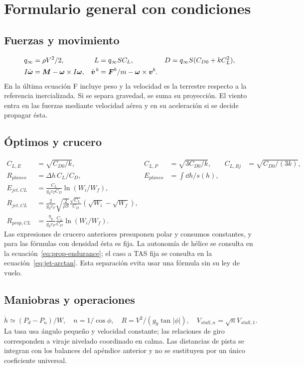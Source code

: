 \chapter{Formulario general con condiciones}
\section{Fuerzas y movimiento}
\begin{align}
q_\infty&=\rho V^2/2,&L&=q_\infty SC_L,&D&=q_\infty S(C_{D0}+kC_L^2),\\
I\dot{\boldsymbol{\omega}}&=\boldsymbol{M}-\boldsymbol{\omega}\times I\boldsymbol{\omega},&
\dot{\boldsymbol{v}}^{\,b}&=\boldsymbol{F}^b/m-\boldsymbol{\omega}\times\boldsymbol{v}^b.
\end{align}
En la última ecuación F incluye peso y la velocidad es la terrestre respecto a la referencia inercializada. Si se separa gravedad, se suma su proyección. El viento entra en las fuerzas mediante velocidad aérea y en su aceleración si se decide propagar ésta.

\section{Óptimos y crucero}
\begin{align}
C_{L,E}&=\sqrt{C_{D0}/k},&C_{L,P}&=\sqrt{3C_{D0}/k},&C_{L,Rj}&=\sqrt{C_{D0}/(3k)},\\
R_{planeo}&=\Delta h\,C_L/C_D,&E_{planeo}&=\int\dd h/s(h),\\
E_{jet,CL}&=\frac{C_L}{g_0c_TC_D}\ln(W_i/W_f),\\
R_{jet,CL}&=\frac2{g_0c_T}\sqrt{\frac2{\rho S}}\frac{\sqrt{C_L}}{C_D}(\sqrt{W_i}-\sqrt{W_f}),\\
R_{prop,CL}&=\frac{\eta_p}{g_0c_P}\frac{C_L}{C_D}\ln(W_i/W_f).
\end{align}
Las expresiones de crucero anteriores presuponen polar y consumos constantes, y para las fórmulas con densidad ésta es fija. La autonomía de hélice se consulta en la ecuación~\eqref{eq:prop-endurance}; el caso a TAS fija se consulta en la ecuación~\eqref{eq:jet-arctan}. Esta separación evita usar una fórmula sin su ley de vuelo.

\section{Maniobras y operaciones}
\begin{equation}
\dot h\simeq(P_d-P_n)/W,\quad n=1/\cos\phi,\quad
R=V^2/(g_0\tan|\phi|),\quad V_{stall,n}=\sqrt nV_{stall,1}.
\end{equation}
La tasa usa ángulo pequeño y velocidad constante; las relaciones de giro corresponden a viraje nivelado coordinado en calma. Las distancias de pista se integran con los balances del apéndice anterior y no se sustituyen por un único coeficiente universal.


